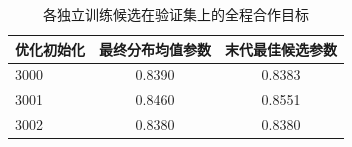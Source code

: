 \begin{table}[!htbp]
\centering
\caption{各独立训练候选在验证集上的全程合作目标}
\label{tab:w2-training-validation}
\begin{tabular}{lcc}
\toprule
优化初始化 & 最终分布均值参数 & 末代最佳候选参数 \\
\midrule
3000 & 0.8390 & 0.8383 \\
3001 & 0.8460 & 0.8551 \\
3002 & 0.8380 & 0.8380 \\
\bottomrule
\end{tabular}
\par{}
\end{table}
